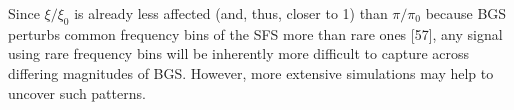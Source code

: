 \documentclass[9pt,twocolumn,twoside]{rilabRxiv}
\begin{document}
Since $\xi/\xi_0$ is already less affected (and, thus, closer
to 1) than $\pi/\pi_0$ because BGS perturbs common frequency
bins of the SFS more than rare ones [57], any signal using rare
frequency bins will be inherently more difficult to capture across
differing magnitudes of BGS. However, more extensive simulations may
help to uncover such patterns.

\end{document}
